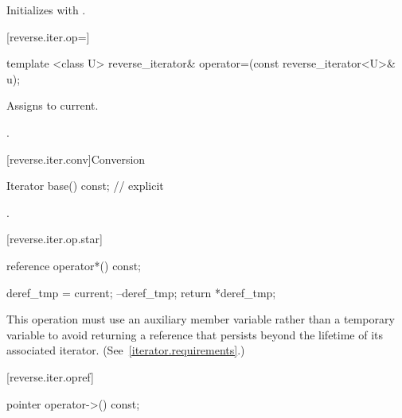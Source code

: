 \begin{itemdescr}
\pnum
\effects
Initializes
with
.
\end{itemdescr}

[reverse.iter.op=]{}

%
\begin{itemdecl}
template <class U>
reverse_iterator&
  operator=(const reverse_iterator<U>& u);
\end{itemdecl}

\begin{itemdescr}
\pnum
\effects
Assigns  to current.

\pnum
\returns
{}.
\end{itemdescr}

[reverse.iter.conv]{Conversion}

%
%
\begin{itemdecl}
Iterator base() const;          // explicit
\end{itemdecl}

\begin{itemdescr}
\pnum
\returns
{}.
\end{itemdescr}

[reverse.iter.op.star]{}

%
\begin{itemdecl}
reference operator*() const;
\end{itemdecl}

\begin{itemdescr}
\pnum
\effects
\begin{codeblock}
deref_tmp = current;
--deref_tmp;
return *deref_tmp;
\end{codeblock}

\pnum
\enternote
This operation must use an auxiliary member variable rather than a
temporary variable to avoid returning a reference that persists beyond
the lifetime of its associated iterator.
(See~\ref{iterator.requirements}.)
\exitnote
\end{itemdescr}

[reverse.iter.opref]{}

%
\begin{itemdecl}
pointer operator->() const;
\end{itemdecl}

